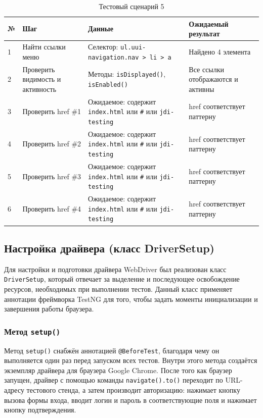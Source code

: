 \documentclass{article}[14pt]
\begin{document}
\begin{table}[H]
\centering
\caption{Тестовый сценарий 5}
\label{tab:test_scenario_5}
\begin{tabular}{|l|p{3.5cm}|p{4.5cm}|p{3.5cm}|}
\hline
\textbf{№} & \textbf{Шаг} & \textbf{Данные} & \textbf{Ожидаемый результат} \\
\hline
1 & Найти ссылки меню & Селектор: \texttt{ul.uui-navigation.nav > li > a} & Найдено 4 элемента \\
\hline
2 & Проверить видимость и активность & Методы: \texttt{isDisplayed()}, \texttt{isEnabled()} & Все ссылки отображаются и активны \\
\hline
3 & Проверить href \#1 & Ожидаемое: содержит \texttt{index.html} или \texttt{\#} или \texttt{jdi-testing} & href соответствует паттерну \\
\hline
4 & Проверить href \#2 & Ожидаемое: содержит \texttt{index.html} или \texttt{\#} или \texttt{jdi-testing} & href соответствует паттерну \\
\hline
5 & Проверить href \#3 & Ожидаемое: содержит \texttt{index.html} или \texttt{\#} или \texttt{jdi-testing} & href соответствует паттерну \\
\hline
6 & Проверить href \#4 & Ожидаемое: содержит \texttt{index.html} или \texttt{\#} или \texttt{jdi-testing} & href соответствует паттерну \\
\hline
\end{tabular}
\end{table}

\subsection{Настройка драйвера (класс DriverSetup)}

Для настройки и подготовки драйвера WebDriver был реализован класс \texttt{DriverSetup}, который отвечает за выделение и последующее освобождение ресурсов, необходимых при выполнении тестов. Данный класс применяет аннотации фреймворка TestNG для того, чтобы задать моменты инициализации и завершения работы браузера.

\subsubsection*{Метод \texttt{setup()}}
Метод \texttt{setup()} снабжён аннотацией \texttt{@BeforeTest}, благодаря чему он выполняется один раз перед запуском всех тестов. Внутри этого метода создаётся экземпляр драйвера для браузера Google Chrome. После того как браузер запущен, драйвер с помощью команды \texttt{navigate().to()} переходит по URL-адресу тестового стенда, а затем производит авторизацию: нажимает кнопку вызова формы входа, вводит логин и пароль в соответствующие поля и нажимает кнопку подтверждения.
\end{document}
